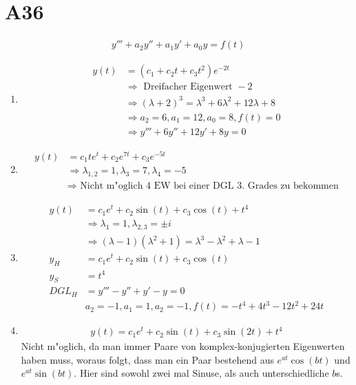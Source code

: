 \documentclass[fleqn,12pt]{scrartcl}
\begin{document}
\section*{A36}
		\begin{align*}
			y''' + a_2y'' + a_1y' + a_0y = f(t)
		\end{align*}
\begin{enumerate}
	\item
		\begin{align*}
			y(t) &= (c_1 + c_2t + c_3t^2)e^{-2t}\\
							&\Rightarrow \text{ Dreifacher Eigenwert } -2\\
						 &\Rightarrow(\lambda +2)^3 =  \lambda^3+6 \lambda^2+12 \lambda+8\\
						 &\Rightarrow a_2 = 6, a_1 = 12, a_0 = 8, f(t) = 0\\
					&\Rightarrow y''' + 6y'' + 12y' + 8y = 0
		\end{align*}

	\item
		\begin{align*}
			y(t) &=c_1te^t + c_2e^{7t} + c_3e^{-5t}\\
							&\Rightarrow \lambda_{1,2} = 1, \lambda_3 = 7, \lambda_4=-5\\
						 &\Rightarrow \text{ Nicht m"oglich 4 EW bei einer DGL 3. Grades zu bekommen}
		\end{align*}

	\item
		\begin{align*}
			y(t) &= c_1e^t + c_2\sin(t) + c_3 \cos(t) + t^4\\
							&\Rightarrow \lambda_1 = 1, \lambda_{2,3}= \pm i\\
						 &\Rightarrow (\lambda -1)(\lambda^2+1) = \lambda^3 -\lambda^2+\lambda -1\\
			y_H &= c_1e^t + c_2\sin(t) + c_3\cos(t)\\
			y_S &= t^4\\
			DGL_H &= y''' - y'' + y' - y = 0\\
						&a_2 = -1, a_1 = 1, a_2 = -1, f(t) =  -t^4 + 4 t^3 - 12 t^2 + 24 t
		\end{align*}

	\item
		\begin{align*}
			y(t) = c_1e^t + c_2\sin(t) + c_3\sin(2t) + t^4
		\end{align*}
		Nicht m"oglich, da man immer Paare von komplex-konjugierten Eigenwerten haben muss, woraus folgt, dass man ein Paar bestehend aus $e^{at}\cos(bt)$ und $e^{at}\sin(bt)$. Hier sind sowohl zwei mal Sinuse, als auch unterschiedliche $b$s.
\end{enumerate}
\end{document}
